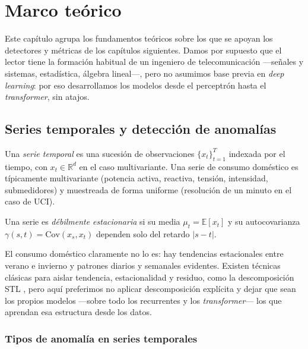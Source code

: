 \chapter{Marco teórico}
\label{cap:teorico}

Este capítulo agrupa los fundamentos teóricos sobre los que se apoyan los detectores y métricas de los capítulos siguientes. Damos por supuesto que el lector tiene la formación habitual de un ingeniero de telecomunicación ---señales y sistemas, estadística, álgebra lineal---, pero no asumimos base previa en \textit{deep learning}: por eso desarrollamos los modelos desde el perceptrón hasta el \textit{transformer}, sin atajos.

\section{Series temporales y detección de anomalías}
\label{sec:teo-ts}

Una \emph{serie temporal} es una sucesión de observaciones $\{x_t\}_{t=1}^{T}$ indexada por el tiempo, con $x_t \in \mathbb{R}^d$ en el caso multivariante. Una serie de consumo doméstico es típicamente multivariante (potencia activa, reactiva, tensión, intensidad, submedidores) y muestreada de forma uniforme (resolución de un minuto en el caso de UCI).

\begin{definicion}
Una serie es \emph{débilmente estacionaria} si su media $\mu_t = \mathbb{E}[x_t]$ y su autocovarianza $\gamma(s, t) = \mathrm{Cov}(x_s, x_t)$ dependen solo del retardo $|s-t|$.
\end{definicion}

El consumo doméstico claramente no lo es: hay tendencias estacionales entre verano e invierno y patrones diarios y semanales evidentes. Existen técnicas clásicas para aislar tendencia, estacionalidad y residuo, como la descomposición STL \cite{cleveland1990stl}, pero aquí preferimos no aplicar descomposición explícita y dejar que sean los propios modelos ---sobre todo los recurrentes y los \textit{transformer}--- los que aprendan esa estructura desde los datos.

\subsection{Tipos de anomalía en series temporales}

